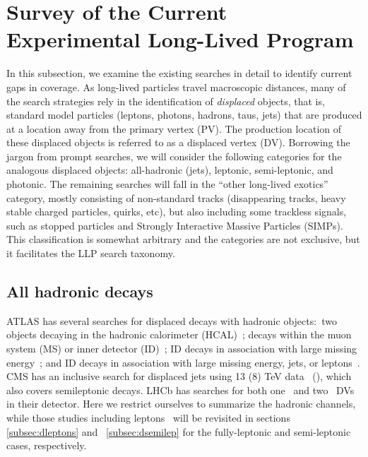 \section{Survey of the Current Experimental Long-Lived Program}
\label{sec:survey}
In this subsection, we examine the existing searches in detail to identify current gaps in coverage.  As long-lived particles travel macroscopic distances, many of the search strategies rely in the identification of \emph{displaced} objects, that is, standard model particles (leptons, photons, hadrons, taus, jets) that are produced at a location away from the primary vertex (PV).
The production location of these displaced objects is referred to as a displaced vertex (DV). Borrowing the jargon from prompt searches, we will consider the following categories for the analogous displaced objects: all-hadronic (jets), leptonic, semi-leptonic, and photonic. The remaining searches will fall in the ``other long-lived exotics'' category, mostly consisting of non-standard tracks (disappearing tracks,  heavy stable charged particles, quirks, etc), but also including some trackless signals, such as stopped particles and Strongly Interactive Massive Particles (SIMPs).
This classification is somewhat arbitrary and the categories are not exclusive, but it facilitates the LLP search taxonomy.

\subsection{All hadronic decays}
\label{subsec:djets}

ATLAS has several searches for displaced decays with hadronic objects:~two objects decaying in the hadronic calorimeter (HCAL)~\cite{ATLAS-CONF-2016-103,CalRatio8TeV}; decays within the muon system (MS) or inner detector (ID)~\cite{Aad:2015uaa}; ID decays in association with large missing energy~\cite{Aaboud:2017iio}; and ID decays in association with large missing energy, jets, or leptons~\cite{Aad:2015rba}.  CMS has an inclusive search for displaced jets using 13 (8) TeV data~\cite{CMS:2017oor} (\cite{Khachatryan:2015wka}), which also covers semileptonic decays. LHCb has searches for both one~\cite{Aaij:2017mic} and two~\cite{Aaij:2016isa} DVs in their detector. Here we restrict ourselves to summarize the hadronic channels, while those studies including leptons~\cite{Aad:2015rba,CMS:2017oor} will be revisited in sections \ref{subsec:dleptons} and ~\ref{subsec:dsemilep} for the fully-leptonic and semi-leptonic cases, respectively.

